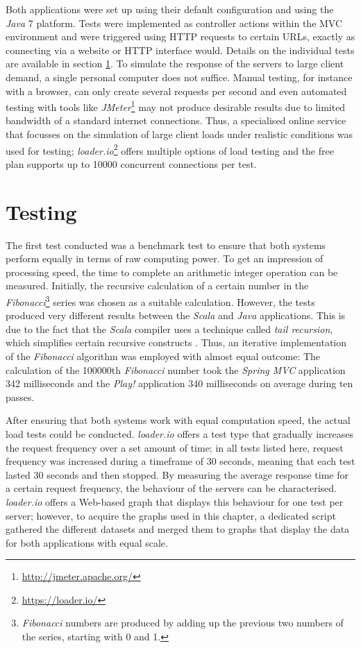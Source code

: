 Both applications were set up using their default configuration and using the \textit{Java} 7 platform. Tests were implemented as controller actions within the MVC environment and were triggered using HTTP requests to certain URLs, exactly as connecting via a website or HTTP interface would. Details on the individual tests are available in section \ref{lab:testing}. To simulate the response of the servers to large client demand, a single personal computer does not suffice. Manual testing, for instance with a browser, can only create several requests per second and even automated testing with tools like \textit{JMeter}\footnote{\url{http://jmeter.apache.org/}} may not produce desirable results due to limited bandwidth of a standard internet connections. Thus, a specialised online service that focusses on the simulation of large client loads under realistic conditions was used for testing; \textit{loader.io}\footnote{\url{https://loader.io/}} offers multiple options of load testing and the free plan supports up to 10000 concurrent connections per test.

\section{Testing} 
\label{lab:testing}
The first test conducted was a benchmark test to ensure that both systems perform equally in terms of raw computing power. To get an impression of processing speed, the time to complete an arithmetic integer operation can be measured. Initially, the recursive calculation of a certain number in the \textit{Fibonacci}\footnote{\textit{Fibonacci} numbers are produced by adding up the previous two numbers of the series, starting with 0 and 1.} series was chosen as a suitable calculation. However, the tests produced very different results between the \textit{Scala} and \textit{Java} applications. This is due to the fact that the \textit{Scala} compiler uses a technique called \textit{tail recursion}, which simplifies certain recursive constructs \cite{Malone2008}. Thus, an iterative implementation of the \textit{Fibonacci} algorithm was employed with almost equal outcome: The calculation of the 100000th \textit{Fibonacci} number took the \textit{Spring MVC} application 342 milliseconds and the \textit{Play!} application 340 milliseconds on average during ten passes.

After ensuring that both systems work with equal computation speed, the actual load tests could be conducted. \textit{loader.io} offers a test type that gradually increases the request frequency over a set amount of time; in all tests listed here, request frequency was increased during a timeframe of 30 seconds, meaning that each test lasted 30 seconds and then stopped. By measuring the average response time for a certain request frequency, the behaviour of the servers can be characterised. \textit{loader.io} offers a Web-based graph that displays this behaviour for one test per server; however, to acquire the graphs used in this chapter, a dedicated script gathered the different datasets and merged them to graphs that display the data for both applications with equal scale.

